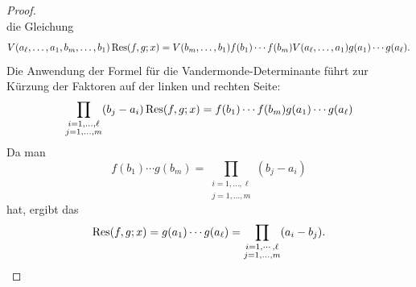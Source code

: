\documentclass[11pt]{article}
\numberwithin{equation}{section}
\begin{document}
\begin{proof}
{\[		\] 
		}
		die Gleichung 
		{\scriptsize 
		\[
			V(a_\ell,\ldots,a_1,b_m,\ldots,b_1) \operatorname{Res}(f,g;x) = V(b_m,\ldots,b_1) f(b_1) \cdots f(b_m) V(a_\ell,\ldots,a_1) g(a_1) \cdots g(a_\ell). 
		\]
		}
		Die Anwendung der Formel für die Vandermonde-Determinante führt zur Kürzung der Faktoren auf der linken und rechten Seite: 
		\[
			\prod_{\substack{i=1,\ldots,\ell \\ j=1,\ldots,m} } (b_j - a_i)  \operatorname{Res}(f,g;x) =  f(b_1) \cdots f(b_m) g(a_1) \cdots g(a_\ell)
		\]
		Da man 
		\[
			f(b_1) \cdots g(b_m) = \prod_{\substack{i=1,\ldots,\ell \\ j=1,\ldots,m} } (b_j - a_i) 
		\]
		hat, ergibt das 
		\[
				\operatorname{Res}(f,g;x) = g(a_1) \cdots g(a_\ell) = \prod_{ \substack{i=1,\cdots, \ell \\ j=1,\ldots,m} } (a_i - b_j).  
		\]
\end{proof} 
\end{document}
